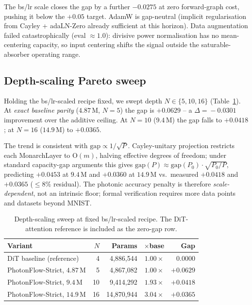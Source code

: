 \documentclass[conference]{IEEEtran}
\begin{document}
The bs/lr scale closes the gap by a further $-0.0275$ at zero
forward-graph cost, pushing it below the $+0.05$ target.  AdamW is
gap-neutral (implicit regularisation from Cayley + adaLN-Zero
already sufficient at this horizon).  Data augmentation failed
catastrophically (eval ${\approx}1.0$): divisive power
normalisation has no mean-centering capacity, so input centering
shifts the signal outside the saturable-absorber operating range.

\subsection{Depth-scaling Pareto sweep}
\label{sec:exp-scale}

Holding the bs/lr-scaled recipe fixed, we swept depth
$N\!\in\!\{5,10,16\}$ (Table~\ref{tab:scale}).  At \emph{exact
baseline parity} ($4.87$\,M, $N{=}5$) the gap is $+0.0629$ -- a
$\Delta\!=\!-0.0301$ improvement over the additive ceiling.  At
$N{=}10$ ($9.4$\,M) the gap falls to $+0.0418$; at $N{=}16$
($14.9$\,M) to $+0.0365$.

The trend is consistent with $\mathrm{gap}\!\propto\!1/\sqrt{P}$.
Cayley-unitary projection restricts each MonarchLayer to
$\mathrm{O}(m)$, halving effective degrees of freedom; under standard
capacity-gap arguments this gives
$\mathrm{gap}(P)\!\approx\!\mathrm{gap}(P_0)\!\cdot\!\sqrt{P_0/P}$,
predicting $+0.0453$ at $9.4$\,M and $+0.0360$ at $14.9$\,M
vs.\ measured $+0.0418$ and $+0.0365$ (${\leq}8\%$ residual).
The photonic accuracy penalty is therefore \emph{scale-dependent},
not an intrinsic floor; formal verification requires more data points
and datasets beyond MNIST.

\begin{table}[tbp]
\caption{Depth-scaling sweep at fixed bs/lr-scaled recipe.  The
DiT-attention reference is included as the zero-gap row.}
\label{tab:scale}
\centering\footnotesize
\setlength{\tabcolsep}{4pt}
\renewcommand{\arraystretch}{1.1}
\begin{tabular}{@{}lrrrr@{}}
\toprule
\textbf{Variant} & $N$ & \textbf{Params} & $\boldsymbol{\times}$\textbf{base} & \textbf{Gap}\\
\midrule
DiT baseline (reference) & 4  &  4{,}886{,}544 & $1.00\times$ & $0.0000$ \\
\midrule
PhotonFlow-Strict, $4.87$\,M  &  5 &  4{,}867{,}082 & $1.00\times$ & $+0.0629$\\
PhotonFlow-Strict, $9.4$\,M   & 10 &  9{,}414{,}292 & $1.93\times$ & $+0.0418$\\
PhotonFlow-Strict, $14.9$\,M  & 16 & 14{,}870{,}944 & $3.04\times$ & $+0.0365$\\
\bottomrule
\end{tabular}
\end{table}
\end{document}
